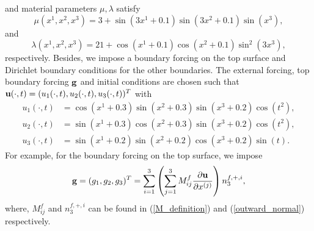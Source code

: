 and material parameters $\mu, \lambda$ satisfy
\begin{equation}\label{mu_function}
\mu(x^1,x^2,x^3) = 3 + \sin(3x^1+0.1)\sin(3x^2+0.1)\sin(x^3),
\end{equation}
and 
\begin{equation}\label{lambda_function}
\lambda(x^1,x^2,x^3)  = 21+ \cos(x^1+0.1)\cos(x^2+0.1)\sin^2(3x^3),
\end{equation}
respectively. Besides, we impose a boundary forcing on the top surface and Dirichlet boundary conditions for the other boundaries. The external forcing, top boundary forcing ${\bf g}$ and initial conditions are chosen such that ${\bf u}(\cdot,t) = (u_1(\cdot,t),u_2(\cdot,t),u_3(\cdot,t))^T$ with
\begin{align*}
u_1(\cdot,t) &= \cos(x^1+0.3)\sin(x^2+0.3)\sin(x^3+0.2)\cos(t^2),\\
u_2(\cdot,t) &= \sin(x^1+0.3)\cos(x^2+0.3)\sin(x^3+0.2)\cos(t^2),\\
u_3(\cdot,t) &= \sin(x^1+0.2)\sin(x^2+0.2)\cos(x^3+0.2)\sin(t).
\end{align*}
For example, for the boundary forcing on the top surface, we impose 
\begin{equation}\label{traction_force}
{\bf g} = (g_1,g_2,g_3)^T = \sum_{i=1}^3\left(\sum_{j = 1}^3 M_{ij}^f\frac{\partial{\bf u}}{\partial x^{(j)}}\right) n^{f,+,i}_3,
\end{equation}
where, $M_{ij}^f$ and $n^{f,+,i}_3 $ can be found in (\ref{M_definition}) and (\ref{outward_normal}) respectively.